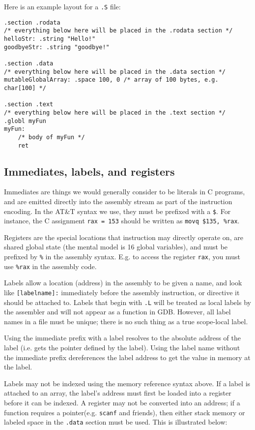 \documentclass[11pt]{article}
\begin{document}
Here is an example layout for a \texttt{.S} file:

\begin{lstlisting}[caption={.S file section layout}, captionpos=b]
.section .rodata
/* everything below here will be placed in the .rodata section */
helloStr: .string "Hello!"
goodbyeStr: .string "goodbye!"

.section .data
/* everything below here will be placed in the .data section */
mutableGlobalArray: .space 100, 0 /* array of 100 bytes, e.g. char[100] */

.section .text
/* everything below here will be placed in the .text section */
.globl myFun
myFun:
    /* body of myFun */
    ret
\end{lstlisting}

\subsection{Immediates, labels, and registers}

Immediates are things we would generally consider to be literals in C programs, and are
emitted directly into the assembly stream as part of the instruction encoding. In the
AT\&T syntax we use, they must be prefixed with a \texttt{\$}. For instance, the C
assignment \texttt{rax = 153} should be written as \texttt{movq \$135, \%rax}.

Registers are the special locations that instruction may directly operate on, are shared
global state (the mental model is 16 global variables), and must be prefixed by
\texttt{\%} in the assembly syntax. E.g. to access the register \texttt{rax}, you must use
\texttt{\%rax} in the assembly code.

Labels allow a location (address) in the assembly to be given a name, and look like
\texttt{[labelname]:} immediately before the assembly instruction, or directive it should
be attached to. Labels that begin with \texttt{.L} will be treated as local labels by the
assembler and will not appear as a function in GDB. However, all label names in a file
must be unique; there is no such thing as a true scope-local label.

Using the immediate prefix with a label resolves to the absolute address of the label (i.e.
gets the pointer defined by the label). Using the label name without the immediate prefix
dereferences the label address to get the value in memory at the label.

Labels may not be indexed using the memory reference syntax above. If a label is attached
to an array, the label's address must first be loaded into a register before it can be
indexed. A register may not be converted into an address; if a function requires a
pointer(e.g. \texttt{scanf} and friends), then either stack memory or labeled space in the
\texttt{.data} section must be used. This is illustrated below:
\end{document}
